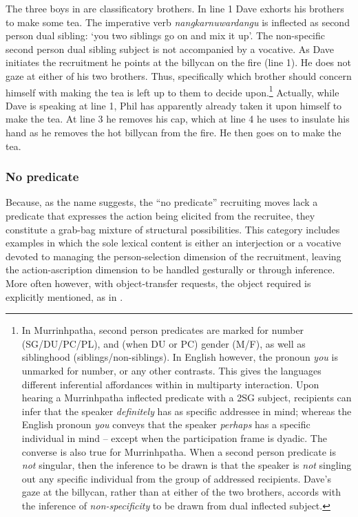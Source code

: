 \documentclass[output=paper,nonflat,colorlinks,citecolor=brown]{langsci/langscibook}
\begin{document}
The three boys in  are classificatory brothers. In line 1 Dave exhorts his brothers to make some tea. The imperative verb \textit{nangkarnuwardangu} is inflected as second person dual sibling: ‘you two siblings go on and mix it up’. The non-specific second person dual sibling subject is not accompanied by a vocative. As Dave initiates the recruitment he points at the billycan on the fire (line 1). He does not gaze at either of his two brothers. Thus, specifically which brother should concern himself with making the tea is left up to them to decide upon.\footnote{In Murrinhpatha, second person predicates are marked for number (SG/DU/PC/PL), and (when DU or PC) gender (M/F), as well as siblinghood (siblings/non-siblings). In English however, the pronoun \textit{you} is unmarked for number, or any other contrasts. This gives the languages different inferential affordances within in multiparty interaction. Upon hearing a Murrinhpatha inflected predicate with a 2SG subject, recipients can infer that the speaker \textit{definitely} has as specific addressee in mind; whereas the English pronoun \textit{you} conveys that the speaker \textit{perhaps} has a specific individual in mind – except when the participation frame is dyadic. The converse is also true for Murrinhpatha. When a second person predicate is \textit{not} singular, then the inference to be drawn is that the speaker is \textit{not} singling out any specific individual from the group of addressed recipients. Dave's gaze at the billycan, rather than at either of the two brothers, accords with the inference of \textit{non-specificity} to be drawn from dual inflected subject.\label{fn:blythe:7}} Actually, while Dave is speaking at line 1, Phil has apparently already taken it upon himself to make the tea. At line 3 he removes his cap, which at line 4 he uses to insulate his hand as he removes the hot billycan from the fire. He then goes on to make the tea.


\subsubsection{No predicate}

Because, as the name suggests, the “no predicate” recruiting moves lack a predicate that expresses the action being elicited from the recruitee, they constitute a grab-bag mixture of structural possibilities. This category includes examples in which the sole lexical content is either an interjection or a vocative devoted to managing the person-selection dimension of the recruitment, leaving the action-ascription dimension to be handled gesturally or through inference. More often however, with object-transfer requests, the object required is explicitly mentioned, as in .
\end{document}
